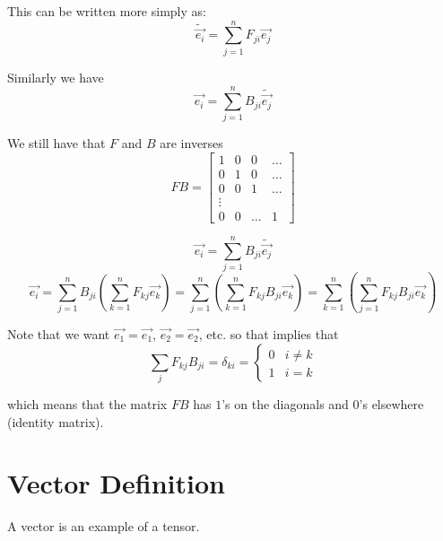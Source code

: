 \documentclass{report}
\begin{document}
This can be written more simply as:
$$ \tilde{\vec{e_i}} = \sum_{j=1}^{n} F_{ji} \vec{e_j}$$ 

Similarly we have
$$ \vec{e_i} = \sum_{j=1}^{n} B_{ji} \tilde{\vec{e_j}}$$ 

We still have that $F$ and $B$ are inverses
$$ FB = \begin{bmatrix} 1 & 0 & 0 & \ldots \\ 0 & 1& 0 & \ldots \\ 0 & 0 & 1 &\ldots \\ \vdots \\ 0 & 0 & \ldots&1 \end{bmatrix}  $$ 

\begin{myproof}
$$ \vec{e_i} = \sum_{j=1}^{n} B_{ji} \tilde{\vec{e_j}}$$ 
$$ \vec{e_i} = \sum_{j=1}^{n} B_{ji} \left( \sum_{k=1}^{n} F_{kj} \vec{e_k} \right)= \sum_{j=1}^{n}  \left( \sum_{k=1}^{n} F_{kj} B_{ji}\vec{e_k} \right) =  \sum_{k=1}^{n}  \left( \sum_{j=1}^{n} F_{kj} B_{ji}\vec{e_k} \right)$$ 

Note that we want $\vec{e_1} = \vec{e_1}$, $\vec{e_2} = \vec{e_2}$, etc.
so that implies that
$$ 
\sum_j F_{kj}  B_{ji} = \delta_{ki} = 
\begin{cases}
	 0 & i \neq k \\
	 1 & i = k
\end{cases} 
$$ 

which means that the matrix $FB$ has $1$'s on the diagonals and $0$'s elsewhere (identity matrix).

\end{myproof}

\chapter{Vector Definition}
A vector is an example of a tensor.
\end{document}
